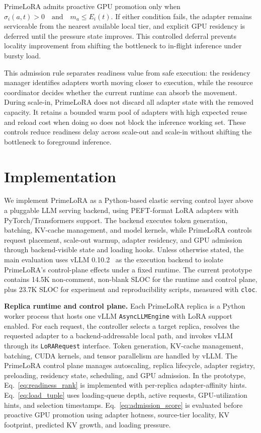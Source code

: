 \documentclass[lettersize,journal]{IEEEtran}
\begin{document}
PrimeLoRA admits proactive GPU promotion only when
$\sigma_i(a,t)>0
\quad \mathrm{and} \quad
m_a \le E_i(t).$
If either condition fails, the adapter remains serviceable from the nearest available local tier, and explicit GPU residency is deferred until the pressure state improves. This controlled deferral prevents locality improvement from shifting the bottleneck to in-flight inference under bursty load.

This admission rule separates readiness value from safe execution: the residency manager identifies adapters worth moving closer to execution, while the resource coordinator decides whether the current runtime can absorb the movement. During scale-in, PrimeLoRA does not discard all adapter state with the removed capacity. It retains a bounded warm pool of adapters with high expected reuse and reload cost when doing so does not block the inference working set. These controls reduce readiness delay across scale-out and scale-in without shifting the bottleneck to foreground inference.

\section{Implementation}

We implement PrimeLoRA as a Python-based elastic serving control layer above a pluggable LLM serving backend, using PEFT-format LoRA adapters with PyTorch/Transformers support. The backend executes token generation, batching, KV-cache management, and model kernels, while PrimeLoRA controls request placement, scale-out warmup, adapter residency, and GPU admission through backend-visible state and loading hooks. Unless otherwise stated, the main evaluation uses vLLM 0.10.2~\cite{vLLM} as the execution backend to isolate PrimeLoRA's control-plane effects under a fixed runtime. The current prototype contains 14.5K non-comment, non-blank SLOC for the runtime and control plane, plus 23.7K SLOC for experiment and reproducibility scripts, measured with \texttt{cloc}.

\textbf{Replica runtime and control plane.}
Each PrimeLoRA replica is a Python worker process that hosts one vLLM \texttt{AsyncLLMEngine} with LoRA support enabled. For each request, the controller selects a target replica, resolves the requested adapter to a backend-addressable local path, and invokes vLLM through its \texttt{LoRARequest} interface. Token generation, KV-cache management, batching, CUDA kernels, and tensor parallelism are handled by vLLM. The PrimeLoRA control plane manages autoscaling, replica lifecycle, adapter registry, preloading, residency state, scheduling, and GPU admission. In the prototype, Eq.~\ref{eq:readiness_rank} is implemented with per-replica adapter-affinity hints. Eq.~\ref{eq:load_tuple} uses loading-queue depth, active requests, GPU-utilization hints, and selection timestamps. Eq.~\ref{eq:admission_score} is evaluated before proactive GPU promotion using adapter hotness, source-tier locality, KV footprint, predicted KV growth, and loading pressure.
\end{document}
